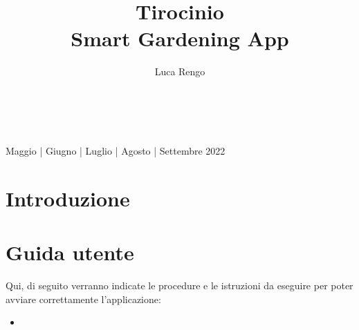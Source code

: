 \documentclass[a4paper,12pt]{report}
\title{\textbf{Tirocinio} \\[1.5ex] Smart Gardening App}
\author{Luca Rengo}
\begin{document}
	
	\makeatletter
	\begin{titlepage}
		\begin{center}
			{\Huge  \@title }\\[3ex] 
			{\large  \@author}\\[3ex] 
			{\large Maggio | Giugno | Luglio | Agosto | Settembre 2022}
		\end{center}
	\end{titlepage}
	\makeatother
	\thispagestyle{empty}
	\newpage
	
	
	\tableofcontents
	
	\newpage
	
	
	
	
	\section{Introduzione}
	
	\begin{comment}
	\begin{figure}[ht] 
		\centering
		\texttt{[image: ./images/]}
		\caption{Homepage}
		\label{fig:homepage}
	\end{figure}
	\end{comment}

	
	
	\newpage
	
	\section{Guida utente}
	
	\textsf{\small Qui, di seguito verranno indicate le procedure e le istruzioni da eseguire per poter avviare correttamente l'applicazione: } \\
	
	\begin{itemize}
		\item \textsf{\small }
	\end{itemize}
\end{document}
